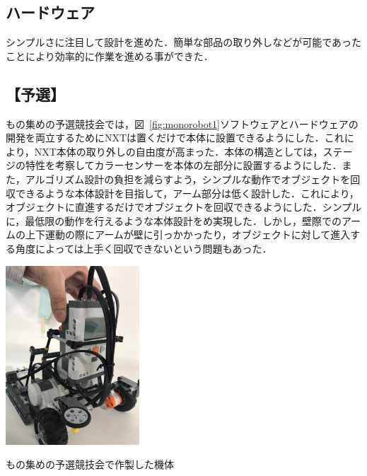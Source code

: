\begin{multicols*}{2}
\subsection{ハードウェア}%
シンプルさに注目して設計を進めた．簡単な部品の取り外しなどが可能であったことにより効率的に作業を進める事ができた．
\subsection*{【予選】}
もの集めの予選競技会では，図~\ref{fig:monorobot1}ソフトウェアとハードウェアの開発を両立するためにNXTは置くだけで本体に設置できるようにした．これにより，NXT本体の取り外しの自由度が高まった．本体の構造としては，ステージの特性を考察してカラーセンサーを本体の左部分に設置するようにした．また，アルゴリズム設計の負担を減らすよう，シンプルな動作でオブジェクトを回収できるような本体設計を目指して，アーム部分は低く設計した．これにより，オブジェクトに直進するだけでオブジェクトを回収できるようにした．シンプルに，最低限の動作を行えるような本体設計をめ実現した．しかし，壁際でのアームの上下運動の際にアームが壁に引っかかったり，オブジェクトに対して進入する角度によっては上手く回収できないという問題もあった．

\begin{figurehere}
  \centering
  \includegraphics[width=5cm]{img/monorobot1.png}
  \caption{もの集めの予選競技会で作製した機体}
  \label{fig:monorobot1}
\end{figurehere}


\end{multicols*}
